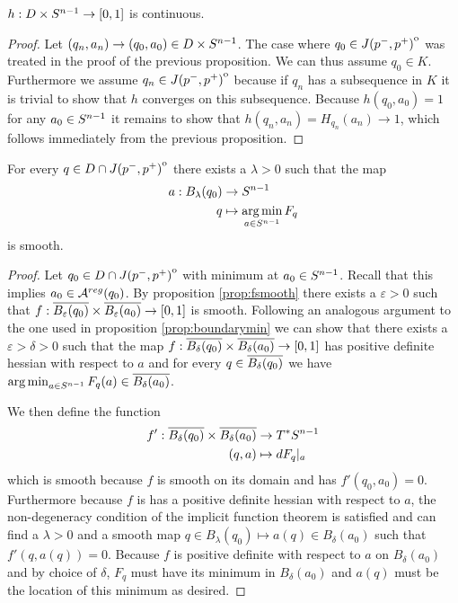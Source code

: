 \begin{corollary}
    $h:D\times {S^{n-1}}\to [0,1]$ is continuous.
\end{corollary}
\begin{proof}
    Let $(q_n,a_n)\to (q_0,a_0)\in D\times {S^{n-1}}$. The case where $q_0\in {\kern0ptJ(p^-,p^+)}^{\mathrm{o}}$ was treated in the proof of the previous proposition. We can thus assume $q_0\in K$. Furthermore we assume $q_n \in {\kern0ptJ(p^-,p^+)}^{\mathrm{o}}$ because if $q_n$ has a subsequence in $K$ it is trivial to show that $h$ converges on this subsequence. Because $h(q_0,a_0)=1$ for any $a_0\in {S^{n-1}}$ it remains to show that $h(q_n,a_n)=H_{q_n}(a_n)\to 1$, which follows immediately from the previous proposition.
\end{proof}

\begin{lemma}
    For every $q\in D\cap {\kern0ptJ(p^-,p^+)}^{\mathrm{o}}$ there exists a $\lambda>0$ such that the map 
    \begin{align*}
        a:B_\lambda(q_0)&\to {S^{n-1}}\\
        q&\mapsto \operatorname*{arg\,min}_{a\in {S^{n-1}}} F_q
    \end{align*} is smooth.
\end{lemma}
\begin{proof}
    Let $q_0\in D\cap {\kern0ptJ(p^-,p^+)}^{\mathrm{o}}$ with minimum at $a_0\in {S^{n-1}}$. Recall that this implies $a_0\in {{\mathcal{A}}^{reg}}(q_0)$.
    By proposition \ref{prop:fsmooth} there exists a $\varepsilon>0$ such that $f:{\overline{B_\varepsilon(q_0)}}\times{\overline{B_\varepsilon(a_0)}}\to [0,1]$ is smooth. Following an analogous argument to the one used in proposition \ref{prop:boundarymin} we can show that there exists a $\varepsilon>\delta>0$ such that the map $f:{\overline{B_\delta(q_0)}}\times{\overline{B_\delta(a_0)}}\to [0,1]$ has positive definite hessian with respect to $a$ and for every $q\in {\overline{B_\delta(q_0)}}$ we have $\operatorname*{arg\,min}_{a\in {S^{n-1}}} F_{q}(a) \in {\overline{B_\delta(a_0)}}$. 

    We then define the function 
    \begin{align*}
        f':{\overline{B_\delta(q_0)}}\times{\overline{B_\delta(a_0)}}&\to T^*{S^{n-1}}\\
        (q,a)&\mapsto dF_q\rvert_a
    \end{align*} which is smooth because $f$ is smooth on its domain and has $f'(q_0,a_0)=0$. Furthermore because $f$ is has a positive definite hessian with respect to $a$, the non-degeneracy condition of the implicit function theorem is satisfied and can find a $\lambda>0$ and a smooth map $q\in B_\lambda(q_0)\mapsto a(q)\in B_\delta(a_0)$ such that $f'(q,a(q))=0$. Because $f$ is positive definite with respect to $a$ on $B_\delta(a_0)$ and by choice of $\delta$, $F_q$ must have its minimum in $B_\delta(a_0)$ and $a(q)$ must be the location of this minimum as desired.
\end{proof}


